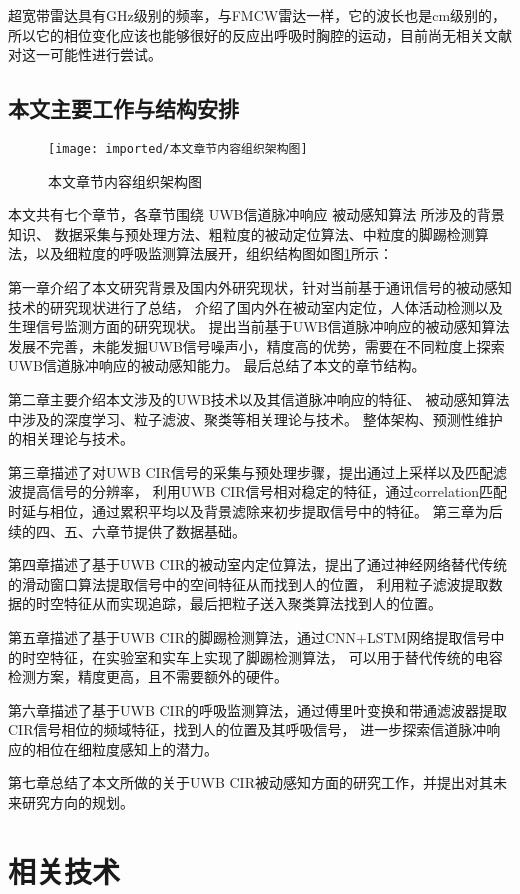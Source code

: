 超宽带雷达具有GHz级别的频率，与FMCW雷达一样，它的波长也是cm级别的，所以它的相位变化应该也能够很好的反应出呼吸时胸腔的运动，目前尚无相关文献对这一可能性进行尝试。

\section{本文主要工作与结构安排}
\begin{figure}[htbp]
    \centering
    \texttt{[image: imported/本文章节内容组织架构图]}
    \caption{\label{fig:structure}本文章节内容组织架构图}
\end{figure}
本文共有七个章节，各章节围绕 UWB信道脉冲响应 被动感知算法 所涉及的背景知识、
数据采集与预处理方法、粗粒度的被动定位算法、中粒度的脚踢检测算法，以及细粒度的呼吸监测算法展开，组织结构图如图\ref{fig:structure}所示：

第一章介绍了本文研究背景及国内外研究现状，针对当前基于通讯信号的被动感知技术的研究现状进行了总结，
介绍了国内外在被动室内定位，人体活动检测以及生理信号监测方面的研究现状。
提出当前基于UWB信道脉冲响应的被动感知算法发展不完善，未能发掘UWB信号噪声小，精度高的优势，需要在不同粒度上探索UWB信道脉冲响应的被动感知能力。
最后总结了本文的章节结构。

第二章主要介绍本文涉及的UWB技术以及其信道脉冲响应的特征、
被动感知算法中涉及的深度学习、粒子滤波、聚类等相关理论与技术。
整体架构、预测性维护的相关理论与技术。

第三章描述了对UWB CIR信号的采集与预处理步骤，提出通过上采样以及匹配滤波提高信号的分辨率，
利用UWB CIR信号相对稳定的特征，通过correlation匹配时延与相位，通过累积平均以及背景滤除来初步提取信号中的特征。
第三章为后续的四、五、六章节提供了数据基础。

第四章描述了基于UWB CIR的被动室内定位算法，提出了通过神经网络替代传统的滑动窗口算法提取信号中的空间特征从而找到人的位置，
利用粒子滤波提取数据的时空特征从而实现追踪，最后把粒子送入聚类算法找到人的位置。

第五章描述了基于UWB CIR的脚踢检测算法，通过CNN+LSTM网络提取信号中的时空特征，在实验室和实车上实现了脚踢检测算法，
可以用于替代传统的电容检测方案，精度更高，且不需要额外的硬件。

第六章描述了基于UWB CIR的呼吸监测算法，通过傅里叶变换和带通滤波器提取CIR信号相位的频域特征，找到人的位置及其呼吸信号，
进一步探索信道脉冲响应的相位在细粒度感知上的潜力。

第七章总结了本文所做的关于UWB CIR被动感知方面的研究工作，并提出对其未来研究方向的规划。
\chapter{相关技术}
